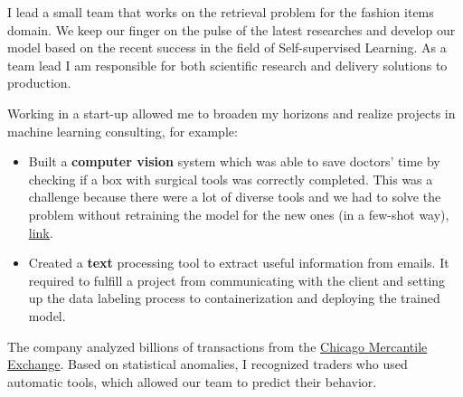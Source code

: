 
I lead a small team that works on the retrieval problem for the fashion items domain.
We keep our finger on the pulse of the latest researches and develop our model based on the recent success in the field of Self-supervised Learning.
As a team lead I am responsible for both scientific research and delivery solutions to production.

\divider

Working in a start-up allowed me to broaden my horizons and realize projects in machine learning consulting, for example:
\begin{itemize}
\item Built a \textbf{computer vision} system which was able to save doctors' time by checking if a box with surgical tools was correctly completed. This was a challenge because there were a lot of diverse tools and we had to solve the problem without retraining the model for the new ones (in a few-shot way), \href{https://drive.google.com/file/d/1FBNRTkxkGzzfVHlrwJCauK7xjBWkI7xO/view?usp=sharing}{\underline{link}}.
\item Created a \textbf{text} processing tool to extract useful information from emails. It required to fulfill a project from communicating with the client and setting up the data labeling process to containerization and deploying the trained model.
\end{itemize}

\divider

The company analyzed billions of transactions from the \href{https://en.wikipedia.org/wiki/Chicago_Mercantile_Exchange}
{Chicago Mercantile Exchange}.
Based on statistical anomalies, I recognized traders who used automatic tools, which allowed our team to predict their behavior.
